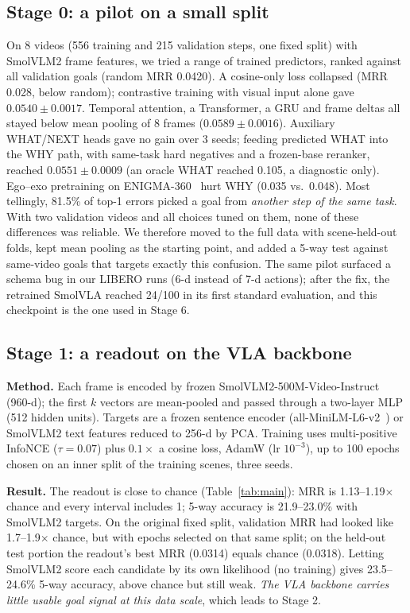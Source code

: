 \documentclass[conference,a4paper]{IEEEtran}
\begin{document}
\subsection{Stage 0: a pilot on a small split}
On 8 videos (556 training and 215 validation steps, one fixed split) with SmolVLM2 frame features, we tried a range of trained predictors, ranked against all validation goals (random MRR 0.0420). A cosine-only loss collapsed (MRR 0.028, below random); contrastive training with visual input alone gave $0.0540\pm0.0017$. Temporal attention, a Transformer, a GRU and frame deltas all stayed below mean pooling of 8 frames ($0.0589\pm0.0016$). Auxiliary WHAT/NEXT heads gave no gain over 3 seeds; feeding predicted WHAT into the WHY path, with same-task hard negatives and a frozen-base reranker, reached $0.0551\pm0.0009$ (an oracle WHAT reached 0.105, a diagnostic only). Ego--exo pretraining on ENIGMA-360~\cite{ragusa2026enigma360} hurt WHY (0.035 vs.\ 0.048). Most tellingly, 81.5\% of top-1 errors picked a goal from \emph{another step of the same task}. With two validation videos and all choices tuned on them, none of these differences was reliable. We therefore moved to the full data with scene-held-out folds, kept mean pooling as the starting point, and added a 5-way test against same-video goals that targets exactly this confusion. The same pilot surfaced a schema bug in our LIBERO runs (6-d instead of 7-d actions); after the fix, the retrained SmolVLA reached 24/100 in its first standard evaluation, and this checkpoint is the one used in Stage 6.

\subsection{Stage 1: a readout on the VLA backbone}
\textbf{Method.} Each frame is encoded by frozen SmolVLM2-500M-Video-Instruct (960-d); the first $k$ vectors are mean-pooled and passed through a two-layer MLP (512 hidden units). Targets are a frozen sentence encoder (all-MiniLM-L6-v2~\cite{reimers2019sbert}) or SmolVLM2 text features reduced to 256-d by PCA. Training uses multi-positive InfoNCE ($\tau=0.07$) plus $0.1\times$ a cosine loss, AdamW (lr $10^{-3}$), up to 100 epochs chosen on an inner split of the training scenes, three seeds.

\textbf{Result.} The readout is close to chance (Table~\ref{tab:main}): MRR is 1.13--1.19$\times$ chance and every interval includes 1; 5-way accuracy is 21.9--23.0\% with SmolVLM2 targets. On the original fixed split, validation MRR had looked like 1.7--1.9$\times$ chance, but with epochs selected on that same split; on the held-out test portion the readout's best MRR (0.0314) equals chance (0.0318). Letting SmolVLM2 score each candidate by its own likelihood (no training) gives 23.5--24.6\% 5-way accuracy, above chance but still weak. \emph{The VLA backbone carries little usable goal signal at this data scale}, which leads to Stage 2.
\end{document}
